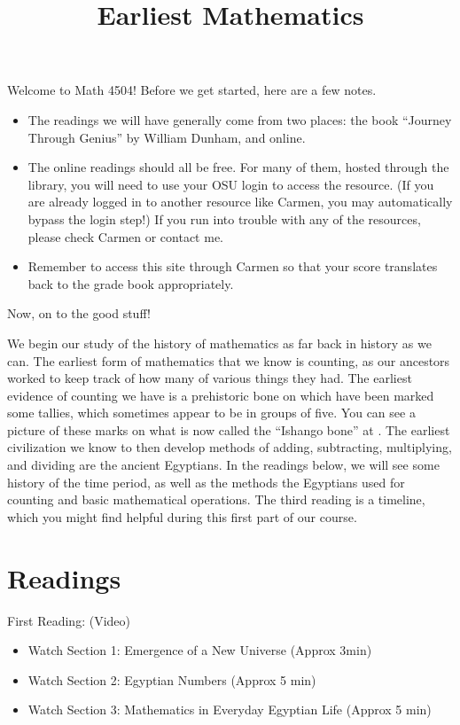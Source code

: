 \documentclass{ximera}
\title{Earliest Mathematics}
\begin{document}
\begin{abstract}
\end{abstract}
\maketitle

Welcome to Math 4504! Before we get started, here are a few notes.
\begin{itemize}
	\item The readings we will have generally come from two places: the book ``Journey Through Genius'' by William Dunham, and online.
	\item The online readings should all be free.  For many of them, hosted through the library, you will need to use your OSU login to access the resource. (If you are already logged in to another resource like Carmen, you may automatically bypass the login step!)  If you run into trouble with any of the resources, please check Carmen or contact me.
	\item Remember to access this site through Carmen so that your score translates back to the grade book appropriately.
\end{itemize}

Now, on to the good stuff!


We begin our study of the history of mathematics as far back in history as we can.  The earliest form of mathematics that we know is counting, as our 
ancestors worked to keep track of how many of various things they had. The earliest evidence of counting we have is a prehistoric bone on which have been 
marked some tallies, which sometimes appear to be in groups of five.  You can see a picture of these marks on what is now called the ``Ishango bone'' 
at .  The earliest civilization we know to then develop methods of 
adding, subtracting, multiplying, and dividing are the ancient Egyptians.  In the readings below, we will see some history of the time period, as well as 
the methods the Egyptians used for counting and basic mathematical operations.  The third reading is a timeline, which you might find helpful during 
this first part of our course.




\section{Readings}

First Reading: (Video) 
\begin{itemize}
\item Watch Section 1: Emergence of a New Universe (Approx 3min)
\item Watch Section 2: Egyptian Numbers (Approx 5 min)
\item Watch Section 3: Mathematics in Everyday Egyptian Life (Approx 5 min)
\end{itemize}
\end{document}
